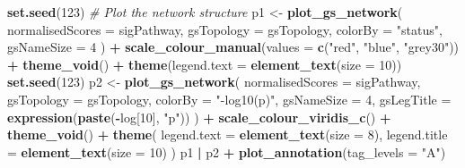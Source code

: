 \documentclass[9pt,a4paper,]{extarticle}
\newenvironment{Shaded}{\begin{snugshade}}{\end{snugshade}}
\newcommand{\AttributeTok}[1]{\textcolor[rgb]{0.13,0.29,0.53}{#1}}
\newcommand{\CommentTok}[1]{\textcolor[rgb]{0.56,0.35,0.01}{\textit{#1}}}
\newcommand{\DecValTok}[1]{\textcolor[rgb]{0.00,0.00,0.81}{#1}}
\newcommand{\FunctionTok}[1]{\textcolor[rgb]{0.13,0.29,0.53}{\textbf{#1}}}
\newcommand{\NormalTok}[1]{#1}
\newcommand{\OtherTok}[1]{\textcolor[rgb]{0.56,0.35,0.01}{#1}}
\newcommand{\SpecialCharTok}[1]{\textcolor[rgb]{0.81,0.36,0.00}{\textbf{#1}}}
\newcommand{\StringTok}[1]{\textcolor[rgb]{0.31,0.60,0.02}{#1}}
\begin{document}
\begin{Shaded}
\begin{Highlighting}[]
\FunctionTok{set.seed}\NormalTok{(}\DecValTok{123}\NormalTok{)}
\CommentTok{\# Plot the network structure}
\NormalTok{p1 }\OtherTok{\textless{}{-}} \FunctionTok{plot\_gs\_network}\NormalTok{(}
  \AttributeTok{normalisedScores =}\NormalTok{ sigPathway, }\AttributeTok{gsTopology =}\NormalTok{ gsTopology, }\AttributeTok{colorBy =} \StringTok{"status"}\NormalTok{,}
  \AttributeTok{gsNameSize =} \DecValTok{4}
\NormalTok{) }\SpecialCharTok{+}
  \FunctionTok{scale\_colour\_manual}\NormalTok{(}\AttributeTok{values =} \FunctionTok{c}\NormalTok{(}\StringTok{"red"}\NormalTok{, }\StringTok{"blue"}\NormalTok{, }\StringTok{"grey30"}\NormalTok{)) }\SpecialCharTok{+}
  \FunctionTok{theme\_void}\NormalTok{() }\SpecialCharTok{+}
  \FunctionTok{theme}\NormalTok{(}\AttributeTok{legend.text =} \FunctionTok{element\_text}\NormalTok{(}\AttributeTok{size =} \DecValTok{10}\NormalTok{)) }
\FunctionTok{set.seed}\NormalTok{(}\DecValTok{123}\NormalTok{)}
\NormalTok{p2 }\OtherTok{\textless{}{-}} \FunctionTok{plot\_gs\_network}\NormalTok{(}
  \AttributeTok{normalisedScores =}\NormalTok{ sigPathway,}
  \AttributeTok{gsTopology =}\NormalTok{ gsTopology, }
  \AttributeTok{colorBy  =} \StringTok{"{-}log10(p)"}\NormalTok{, }
  \AttributeTok{gsNameSize =} \DecValTok{4}\NormalTok{,}
  \AttributeTok{gsLegTitle =} \FunctionTok{expression}\NormalTok{(}\FunctionTok{paste}\NormalTok{(}\SpecialCharTok{{-}}\NormalTok{log[}\DecValTok{10}\NormalTok{], }\StringTok{"p"}\NormalTok{))}
\NormalTok{) }\SpecialCharTok{+}
  \FunctionTok{scale\_colour\_viridis\_c}\NormalTok{() }\SpecialCharTok{+}
  \FunctionTok{theme\_void}\NormalTok{() }\SpecialCharTok{+}
  \FunctionTok{theme}\NormalTok{(}
    \AttributeTok{legend.text =} \FunctionTok{element\_text}\NormalTok{(}\AttributeTok{size =} \DecValTok{8}\NormalTok{),}
    \AttributeTok{legend.title =} \FunctionTok{element\_text}\NormalTok{(}\AttributeTok{size =} \DecValTok{10}\NormalTok{)}
\NormalTok{  ) }
\NormalTok{p1 }\SpecialCharTok{|}\NormalTok{ p2 }\SpecialCharTok{+} \FunctionTok{plot\_annotation}\NormalTok{(}\AttributeTok{tag\_levels =} \StringTok{"A"}\NormalTok{) }
\end{Highlighting}
\end{Shaded}
\end{document}
